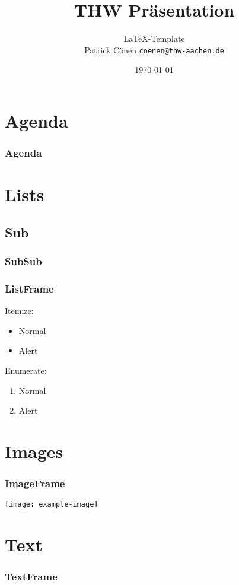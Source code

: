 \documentclass{beamer}
\title{THW Präsentation}
\author{\LaTeX-Template\\Patrick Cönen \texttt{coenen@thw-aachen.de}}
\date{\today}
\begin{document}
\begin{frame}
  \titlepage
\end{frame}

\section*{Agenda}
\begin{frame}
  \frametitle{Agenda}
  \tableofcontents
\end{frame}

\section{Lists}
\subsection{Sub}
\subsubsection{SubSub}

\begin{frame}
  \frametitle{ListFrame}
  Itemize:
  \begin{itemize}
    \item{Normal}
    \item<alert@1>{Alert}
  \end{itemize}
  Enumerate:
  \begin{enumerate}
    \item{Normal}
    \item<alert@1>{Alert}
  \end{enumerate}
\end{frame}

\section{Images}

\begin{frame}
  \frametitle{ImageFrame}
  \centering
  \texttt{[image: example-image]}
\end{frame}

\section{Text}

\begin{frame}
  \frametitle{TextFrame}
  \small{}
  \blindtext
\end{frame}
\end{document}

